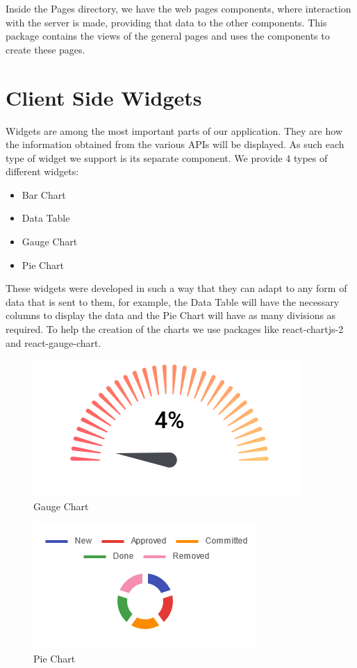 \documentclass[a4paper,twoside,10pt]{report}
\begin{document}
Inside the Pages directory, we have the web pages components, where interaction with the server is made, providing that data to the other components. This package contains the views of the general pages and uses the components to create these pages. 
\newpage

\section{Client Side Widgets}

Widgets are among the most important parts of our application. They are how the information obtained from the various APIs will be displayed.
\newline
As such each type of widget we support is its separate component. 
\newline
We provide 4 types of different widgets:
 \begin{itemize}
	\item Bar Chart
	\item Data Table
	\item Gauge Chart
	\item Pie Chart
\end{itemize}
These widgets were developed in such a way that they can adapt to any form of data that is sent to them, for example, the Data Table will have the necessary columns to display the data and the Pie Chart will have as many divisions as required. To help the creation of the charts we use packages like react-chartjs-2 and react-gauge-chart.
\begin{figure}[h!]
\center
  \includegraphics[]{gauge-chart.png}
\caption{Gauge Chart}
\end{figure}

\begin{figure}[h!]
\center
  \includegraphics[]{pie-chart.png}
\caption{Pie Chart}
\end{figure}
\end{document}
